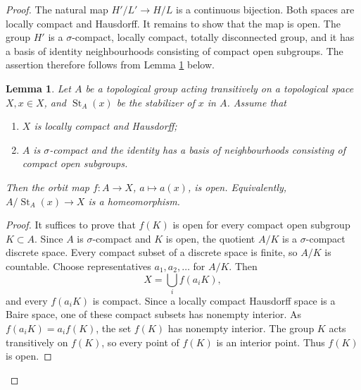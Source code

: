 \documentclass[11pt,a4paper,twoside]{amsart}
\newtheorem{lemma}[theorem]{Lemma}
\theoremstyle{definition}
\theoremstyle{remark}
\newcommand{\St}{\operatorname{St}}
\begin{document}
\begin{proof}
The natural map $H'/L'\to H/L$ is a continuous bijection. Both spaces are locally compact and Hausdorff. It remains to show that the map is open. The group $H'$ is a $\sigma$-compact, locally compact, totally disconnected group, and it has a basis of identity neighbourhoods consisting of compact open subgroups. The assertion therefore follows from Lemma \ref{open} below.


\begin{lemma}\label{open}
Let $A$ be a topological group acting transitively on a topological space $X, x\in X $, and  $\St_A(x)$ be the stabilizer of $x$ in $A$. Assume that
\begin{enumerate}
\item $X$ is locally compact and Hausdorff;
\item $A$ is $\sigma$-compact and the identity has a basis of neighbourhoods consisting of compact open subgroups.
\end{enumerate}
Then the orbit map $f:A\to X$, $a\mapsto a(x)$, is open. Equivalently, $A/\St_A(x)\to X$ is a homeomorphism.
\end{lemma}
\begin{proof}
It suffices to prove that $f(K)$ is open for every compact open subgroup $K\subset A$. Since $A$ is $\sigma$-compact and $K$ is open, the quotient $A/K$ is a $\sigma$-compact discrete space. Every compact subset of a discrete space is finite, so $A/K$ is countable. Choose representatives $a_1,a_2,\ldots$ for $A/K$. Then
$$
X=\bigcup_i f(a_iK),
$$
and every $f(a_iK)$ is compact. Since a locally compact Hausdorff space is a Baire space, one of these compact subsets has nonempty interior. As $f(a_iK)=a_i f(K)$, the set $f(K)$ has nonempty interior. The group $K$ acts transitively on $f(K)$, so every point of $f(K)$ is an interior point. Thus $f(K)$ is open.
\end{proof}
\end{proof}
\end{document}
